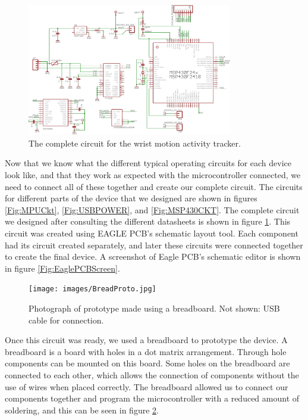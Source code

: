 \begin{figure}
\begin{center}
\includegraphics[angle=-90,width=0.8\textwidth]{images/FULLCKT.eps}
\caption{The complete circuit for the wrist motion activity tracker.}
\label{COMPCKT}
\end{center}
\end{figure}
Now that we know what the different typical operating circuits for each device look like,
and that they work as expected with the microcontroller connected,
we need to connect all of these together and create our complete circuit.
The circuits for different parts of the device that we designed are shown in figures \ref{Fig:MPUCkt}, \ref{Fig:USBPOWER}, and \ref{Fig:MSP430CKT}.
The complete circuit we designed after consulting the different datasheets is shown in figure \ref{COMPCKT}.
This circuit was created using EAGLE PCB's schematic layout tool.
Each component had its circuit created separately,
and later these circuits were connected together to create the final device.
A screenshot of Eagle PCB's schematic editor is shown in figure \ref{Fig:EaglePCBScreen}.
\begin{figure}
\begin{center}
\texttt{[image: images/BreadProto.jpg]}
\caption{Photograph of prototype made using a breadboard. Not shown: USB cable for connection.}
\label{Fig:BreadBoardProto}
\end{center}
\end{figure}

Once this circuit was ready, we used a breadboard to prototype the device.
A breadboard is a board with holes in a dot matrix arrangement.
Through hole components can be mounted on this board.
Some holes on the breadboard are connected to each other,
which allows the connection of components without the use of wires when placed correctly.
The breadboard allowed us to connect our components together and program the microcontroller with a reduced amount of soldering, 
and this can be seen in figure \ref{Fig:BreadBoardProto}.


